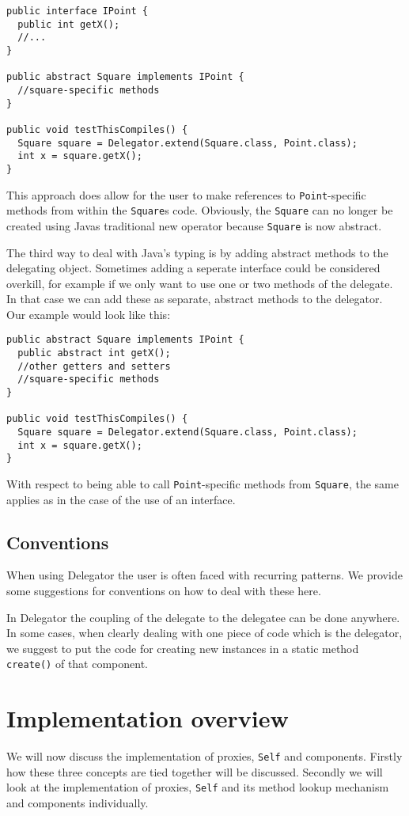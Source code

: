 \documentclass[a4paper,12pt]{book}
\begin{document}
\begin{verbatim}
public interface IPoint {
  public int getX();
  //...
}

public abstract Square implements IPoint {
  //square-specific methods
}

public void testThisCompiles() {
  Square square = Delegator.extend(Square.class, Point.class);
  int x = square.getX();
}
\end{verbatim}

This approach does allow for the user to make references to \verb|Point|-specific methods from within the \verb|Square|s code. Obviously, the \verb|Square| can no longer be created using Javas traditional new operator because \verb|Square| is now abstract.

The third way to deal with Java's typing is by adding abstract methods to the delegating object. Sometimes adding a seperate interface could be considered overkill, for example if we only want to use one or two methods of the delegate. In that case we can add these as separate, abstract methods to the delegator. Our example would look like this:

\begin{verbatim}
public abstract Square implements IPoint {
  public abstract int getX();
  //other getters and setters 
  //square-specific methods
}

public void testThisCompiles() {
  Square square = Delegator.extend(Square.class, Point.class);
  int x = square.getX();
}
\end{verbatim}

With respect to being able to call \verb|Point|-specific methods from \verb|Square|, the same applies as in the case of the use of an interface.

\subsection*{Conventions}
When using Delegator the user is often faced with recurring patterns. We provide some suggestions for conventions on how to deal with these here.

In Delegator the coupling of the delegate to the delegatee can be done anywhere. In some cases, when clearly dealing with one piece of code which is the delegator, we suggest to put the code for creating new instances in a static method \verb|create()| of that component.

\section*{Implementation overview}
We will now discuss the implementation of proxies, \verb|Self| and components. Firstly how these three concepts are tied together will be discussed. Secondly we will look at the implementation of proxies, \verb|Self| and its method lookup mechanism and components individually.
\end{document}
